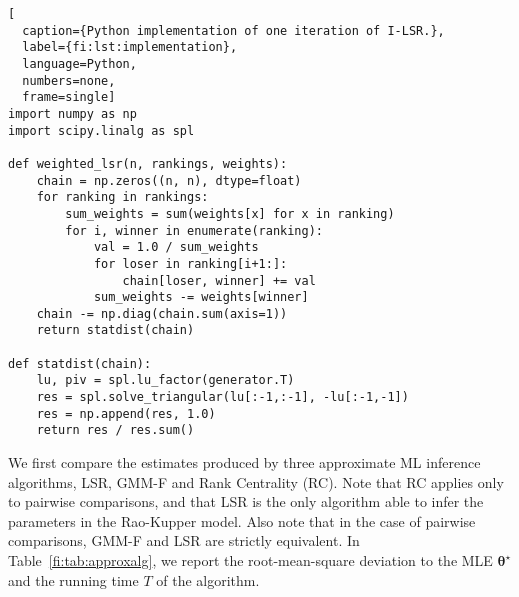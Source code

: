 \begin{lstlisting}[
  caption={Python implementation of one iteration of I-LSR.},
  label={fi:lst:implementation},
  language=Python,
  numbers=none,
  frame=single]
import numpy as np
import scipy.linalg as spl

def weighted_lsr(n, rankings, weights):
    chain = np.zeros((n, n), dtype=float)
    for ranking in rankings:
        sum_weights = sum(weights[x] for x in ranking)
        for i, winner in enumerate(ranking):
            val = 1.0 / sum_weights
            for loser in ranking[i+1:]:
                chain[loser, winner] += val
            sum_weights -= weights[winner]
    chain -= np.diag(chain.sum(axis=1))
    return statdist(chain)

def statdist(chain):
    lu, piv = spl.lu_factor(generator.T)
    res = spl.solve_triangular(lu[:-1,:-1], -lu[:-1,-1])
    res = np.append(res, 1.0)
    return res / res.sum()
\end{lstlisting}

We first compare the estimates produced by three approximate ML inference algorithms, LSR, GMM-F and Rank Centrality (RC).
Note that RC applies only to pairwise comparisons, and that LSR is the only algorithm able to infer the parameters in the Rao-Kupper model.
Also note that in the case of pairwise comparisons, GMM-F and LSR are strictly equivalent.
In Table~\ref{fi:tab:approxalg}, we report the root-mean-square deviation to the MLE $\bm{\theta}^\star$ and the running time $T$ of the algorithm.

